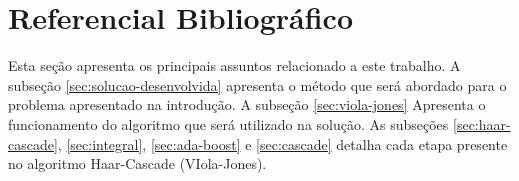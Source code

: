 \section{Referencial Bibliográfico}\label{sec:referencial-bibliografico}

Esta seção apresenta os principais assuntos relacionado a este trabalho. A subseção \ref{sec:solucao-desenvolvida} apresenta o método que será abordado para o problema apresentado na introdução. A subseção \ref{sec:viola-jones} Apresenta o funcionamento do algoritmo que será utilizado na solução. As subseções \ref{sec:haar-cascade}, \ref{sec:integral}, \ref{sec:ada-boost} e \ref{sec:cascade} detalha cada etapa presente no algoritmo Haar-Cascade (VIola-Jones).
